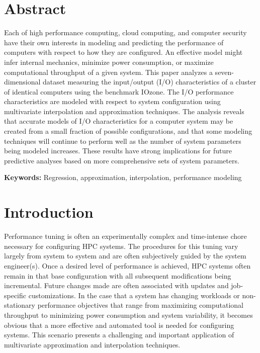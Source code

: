 \documentclass{scspaperproc}
\theoremstyle{scsthe}
\begin{document}
\maketitle

\section*{Abstract}

Each of high performance computing, cloud computing, and computer
security have their own interests in modeling and predicting the
performance of computers with respect to how they are configured. An
effective model might infer internal mechanics, minimize power
consumption, or maximize computational throughput of a given
system. This paper analyzes a seven-dimensional dataset measuring the
input/output (I/O) characteristics of a cluster of identical computers
using the benchmark IOzone. The I/O performance characteristics are
modeled with respect to system configuration using multivariate
interpolation and approximation techniques. The analysis reveals that
accurate models of I/O characteristics for a computer system may be
created from a small fraction of possible configurations, and that
some modeling techniques will continue to perform well as the number
of system parameters being modeled increases. These results have
strong implications for future predictive analyses based on more
comprehensive sets of system parameters.

\textbf{Keywords:} Regression, approximation, interpolation,
performance modeling


\section{Introduction}

Performance tuning is often an experimentally complex and time-intense
chore necessary for configuring HPC systems. The procedures for this
tuning vary largely from system to system and are often subjectively
guided by the system engineer(s). Once a desired level of performance
is achieved, HPC systems often remain in that base configuration with
all subsequent modifications being incremental. Future changes made
are often associated with updates and job-specific customizations. In
the case that a system has changing workloads or non-stationary
performance objectives that range from maximizing computational
throughput to minimizing power consumption and system variability, it
becomes obvious that a more effective and automated tool is needed for
configuring systems. This scenario presents a challenging and
important application of multivariate approximation and interpolation
techniques.
\end{document}
